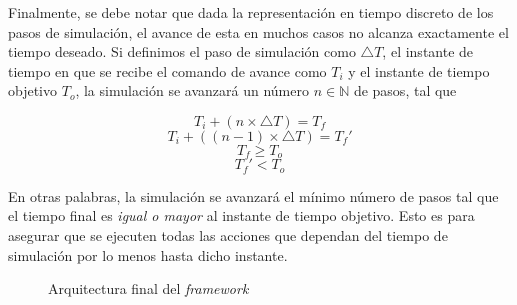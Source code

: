Finalmente, se debe notar que dada la representación en tiempo discreto de los pasos de simulación, el avance de esta en muchos casos no alcanza exactamente el tiempo deseado. Si definimos el paso de simulación como $\triangle T$, el instante de tiempo en que se recibe el comando de avance como $T_{i}$ y el instante de tiempo objetivo $T_{o}$, la simulación se avanzará un número $n \in \mathbb{N}$ de pasos, tal que

\[ T_{i} + (n \times \triangle T) = T_{f} \]
\[ T_{i} + ((n - 1) \times \triangle T) = T_{f}' \]
\[ T_{f} \geq T_{o} \]
\[ T_{f}' < T_{o} \]

En otras palabras, la simulación se avanzará el mínimo número de pasos tal que el tiempo final es \emph{igual o mayor} al instante de tiempo objetivo. Esto es para asegurar que se ejecuten todas las acciones que dependan del tiempo de simulación por lo menos hasta dicho instante.

\begin{figure}[]
    \centering
    
    \caption{Arquitectura final del \emph{framework}}
    \label{fig:ptraci_arch2}
\end{figure}